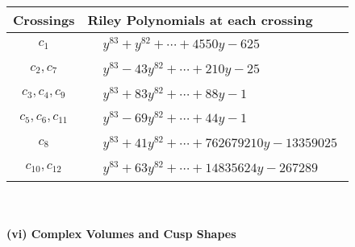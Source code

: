 \documentclass[1p]{elsarticle_modified}
\theoremstyle{definition}
\begin{document}
\begin{tabular}{m{50pt}|m{274pt}}
Crossings & \hspace{64pt}Riley Polynomials at each crossing \\
\hline $$\begin{aligned}c_{1}\end{aligned}$$&$\begin{aligned}
&y^{83}+y^{82}+\cdots+4550 y-625
\end{aligned}$\\
\hline $$\begin{aligned}c_{2},c_{7}\end{aligned}$$&$\begin{aligned}
&y^{83}-43 y^{82}+\cdots+210 y-25
\end{aligned}$\\
\hline $$\begin{aligned}c_{3},c_{4},c_{9}\end{aligned}$$&$\begin{aligned}
&y^{83}+83 y^{82}+\cdots+88 y-1
\end{aligned}$\\
\hline $$\begin{aligned}c_{5},c_{6},c_{11}\end{aligned}$$&$\begin{aligned}
&y^{83}-69 y^{82}+\cdots+44 y-1
\end{aligned}$\\
\hline $$\begin{aligned}c_{8}\end{aligned}$$&$\begin{aligned}
&y^{83}+41 y^{82}+\cdots+762679210 y-13359025
\end{aligned}$\\
\hline $$\begin{aligned}c_{10},c_{12}\end{aligned}$$&$\begin{aligned}
&y^{83}+63 y^{82}+\cdots+14835624 y-267289
\end{aligned}$\\
\hline
\end{tabular}\\~\\
\newpage\flushleft \textbf{(vi) Complex Volumes and Cusp Shapes}
\end{document}
